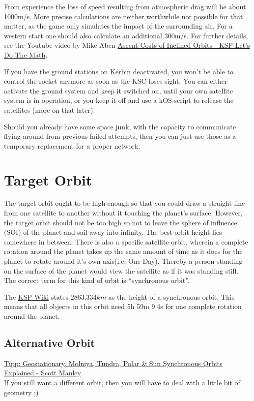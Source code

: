 \documentclass[12pt,paper=A4,numbers=noenddot,bibliography=totoc,listof=totoc,DIV=11,BCOR=1mm]{scrreprt}
\begin{document}
From experience the loss of speed resulting from atmospheric drag will be about 1000m/s. More precise calculations are neither worthwhile nor possible for that matter, as the game only simulates the impact of the surrounding air. For a western start one should also calculate an additional 300m/s. For further details, see the Youtube video by Mike Aben \href{https://youtu.be/0BtbYVtZ9ac}{Ascent Costs of Inclined Orbits - KSP Let's Do The Math}.

If you have the ground stations on Kerbin deactivated, you won't be able to control the rocket anymore as soon as the KSC loses sight. You can either activate the ground system and keep it switched on, until your own satellite system is in operation, or you keep it off and use a kOS-script to release the satellites (more on that later).

Should you already have some space junk, with the capacity to communicate flying around from previous failed attempts, then you can just use those as a temporary replacement for a proper network.


\section{Target Orbit}
The target orbit ought to be high enough so that you could draw a straight line from one satellite to another without it touching the planet's surface. However, the target orbit should not be too high so not to leave the sphere of influence (SOI) of the planet and sail away into infinity. The best orbit height lies somewhere in between. There is also a specific satellite orbit, wherein a complete rotation around the planet takes up the same amount of time as it does for the planet to rotate around it’s own axis(i.e. One Day). Thereby a person standing on the surface of the planet would view the satellite as if it was standing still. The correct term for this kind of orbit is ``synchronous orbit''.

The \href{https://wiki.kerbalspaceprogram.com/wiki/Kerbin}{KSP Wiki} states $2863.334km$ as the height of a synchronous orbit. This means that all objects in this orbit need 5h 59m 9.4s for one complete rotation around the planet.


\subsection{Alternative Orbit}
\href{https://youtu.be/PZAkiXNJIqc}{Tipp: Geostationary, Molniya, Tundra, Polar \& Sun Synchronous Orbits Explained - Scott Manley}\\
If you still want a different orbit, then you will have to deal with a little bit of geometry ;)
\end{document}
